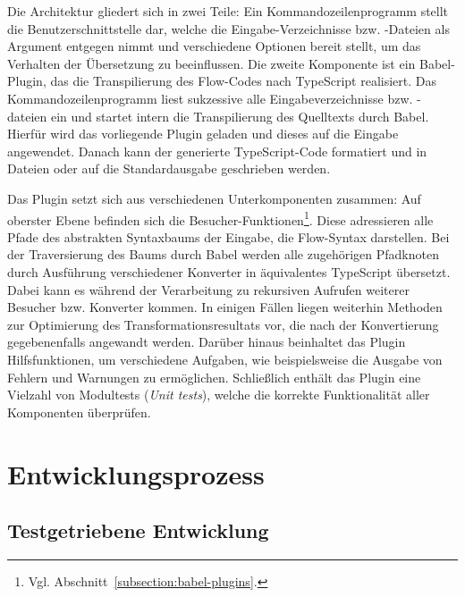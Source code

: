 Die Architektur gliedert sich in zwei Teile: Ein Kommandozeilenprogramm stellt die Benutzerschnittstelle dar, welche die Eingabe-Verzeichnisse bzw. -Dateien als Argument entgegen nimmt und verschiedene Optionen bereit stellt, um das Verhalten der Übersetzung zu beeinflussen. Die zweite Komponente ist ein Babel-Plugin, das die Transpilierung des Flow-Codes nach TypeScript realisiert. Das Kommandozeilenprogramm liest sukzessive alle Eingabeverzeichnisse bzw. -dateien ein und startet intern die Transpilierung des Quelltexts durch Babel. Hierfür wird das vorliegende Plugin geladen und dieses auf die Eingabe angewendet. Danach kann der generierte TypeScript-Code formatiert und in Dateien oder auf die Standardausgabe geschrieben werden.

Das Plugin setzt sich aus verschiedenen Unterkomponenten zusammen: Auf oberster Ebene befinden sich die Besucher-Funktionen\footnote{Vgl. Abschnitt~\ref{subsection:babel-plugins}.}. Diese adressieren alle Pfade des abstrakten Syntaxbaums der Eingabe, die Flow-Syntax darstellen. Bei der Traversierung des Baums durch Babel werden  alle zugehörigen Pfadknoten durch Ausführung verschiedener Konverter in äquivalentes TypeScript übersetzt. Dabei kann es während der Verarbeitung zu rekursiven Aufrufen weiterer Besucher bzw. Konverter kommen. In einigen Fällen liegen weiterhin Methoden zur Optimierung des Transformationsresultats vor, die nach der Konvertierung gegebenenfalls angewandt werden. Darüber hinaus beinhaltet das Plugin Hilfsfunktionen, um verschiedene Aufgaben, wie beispielsweise die Ausgabe von Fehlern und Warnungen zu ermöglichen. Schließlich enthält das Plugin eine Vielzahl von Modultests (\textit{Unit tests}), welche die korrekte Funktionalität aller Komponenten überprüfen.

\section{Entwicklungsprozess}

\subsection{Testgetriebene Entwicklung}

